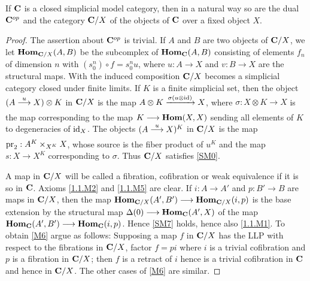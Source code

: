 \documentclass[../main]{subfiles}
\begin{document}
\begin{proposition}\label{prop:2.2.6}
    If $\mathbf{C}$ is a closed simplicial model category, then in a natural way so are the dual $\mathbf{C}^{op}$ and the category $\mathbf{C}/X$ of the objects of $\mathbf{C}$ over a fixed object $X$.
\end{proposition}
\begin{proof}
    The assertion about $\mathbf{C}^{op}$ is trivial. If $A$ and $B$ are two objects of $\mathbf{C}/X$, we let $\operatorname{\mathbf{Hom}}_{\mathbf{C}/X} (A,B)$ be the subcomplex of $\operatorname{\mathbf{Hom}}_{\mathbf{C}}(A,B)$ consisting of elements $f_n$ of dimension $n$ with $(s_0^n)\circ f = s^n_0u$, where $u:A\longrightarrow X$ and $v:B\longrightarrow X$ are the structural maps. With the induced composition $\mathbf{C}/X$ becomes a simplicial category closed under finite limits. If $K$ is a finite simplicial set, then the object $(A\varrightarrow{u} X)\otimes K$ in $\mathbf{C}/X$ is the map $A\otimes K \varrightarrow{\sigma(u\otimes \id)} X$, where $\sigma:X\otimes K\longrightarrow X$ is the map corresponding to the map $K\longrightarrow \operatorname{\mathbf{Hom}}(X,X)$ sending all elements of $K$ to degeneracies of $\operatorname{id}_X$. The objects $(A\varrightarrow{u}X)^K$ in $\mathbf{C}/X$ is the map $\operatorname{pr}_2:A^K\times_{X^K}X$, whose source is the fiber product of $u^K$ and the map $s:X\longrightarrow X^K$ corresponding to $\sigma$. Thus $\mathbf{C}/X$ satisfies \ref{SM0}.
    
    A map in $\mathbf{C}/X$ will be called a fibration, cofibration or weak equivalence if it is so in $\mathbf{C}$. Axioms \ref{1.1.M2} and \ref{1.1.M5} are clear. If $i:A\longrightarrow A'$ and $p:B'\longrightarrow B$ are maps in $\mathbf{C}/X$, then the map $\operatorname{\mathbf{Hom}}_{\mathbf{C}/X}(A',B')\longrightarrow \operatorname{\mathbf{Hom}}_{\mathbf{C}/X}(i,p)$ is the base extension by the structural map $\Delta(0)\longrightarrow \operatorname{\mathbf{Hom}}_{\mathbf{C}}(A',X)$ of the map \\$\operatorname{\mathbf{Hom}}_{\mathbf{C}}(A',B')\longrightarrow \operatorname{\mathbf{Hom}}_{\mathbf{C}}(i,p)$. Hence \ref{SM7} holds, hence also \ref{1.1.M1}. To obtain \ref{M6} argue as follows: Supposing a map $f$ in $\mathbf{C}/X$ has the LLP with respect to the fibrations in $\mathbf{C}/X$, factor $f=pi$ where $i$ is a trivial cofibration and $p$ is a fibration in $\mathbf{C}/X$; then $f$ is a retract of $i$ hence is a trivial cofibration in $\mathbf{C}$ and hence in $\mathbf{C}/X$. The other cases of \ref{M6} are similar.
\end{proof}
\end{document}
